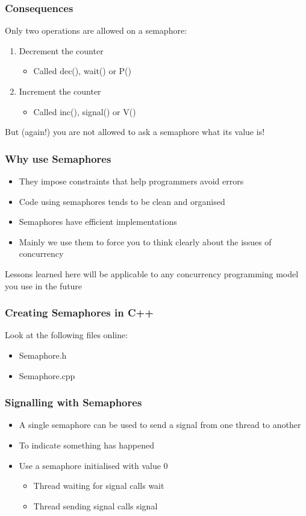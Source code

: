 \documentclass{beamer}
\begin{document}
\begin{frame}
	\frametitle{Consequences}
  Only two operations are allowed on a semaphore:
\begin{enumerate}
	\item Decrement the counter
		\begin{itemize}
		\item Called dec(), wait() or P()
		\end{itemize}
	\item Increment the counter
		\begin{itemize}
		\item Called inc(), signal() or V()
		\end{itemize}
\end{enumerate}
But (again!) you are not allowed to ask a semaphore what its value is!
\end{frame}


\begin{frame}
	\frametitle{Why use Semaphores}
\begin{itemize}
	\item They impose constraints that help programmers avoid errors
	\item Code using semaphores tends to be  clean and organised
	\item Semaphores have efficient implementations
	\item Mainly we use them to force you to think clearly about the issues of concurrency
\end{itemize}
	Lessons learned here will be applicable to any concurrency programming model you use in the future
\end{frame}

\begin{frame}
	\frametitle{Creating Semaphores in C++}
	Look at the following files online:
	\begin{itemize}
	\item Semaphore.h
	\item Semaphore.cpp
	\end{itemize}
\end{frame}

\begin{frame}
	\frametitle{Signalling with Semaphores}
	\begin{itemize}
		\item A single semaphore can be used to send a signal from one thread to another
		\item To indicate something has happened
		\item Use a semaphore initialised with value 0
\begin{itemize}
\item Thread waiting for signal calls wait
\item Thread sending signal calls signal
\end{itemize}
\end{itemize}

\end{frame}
\end{document}
